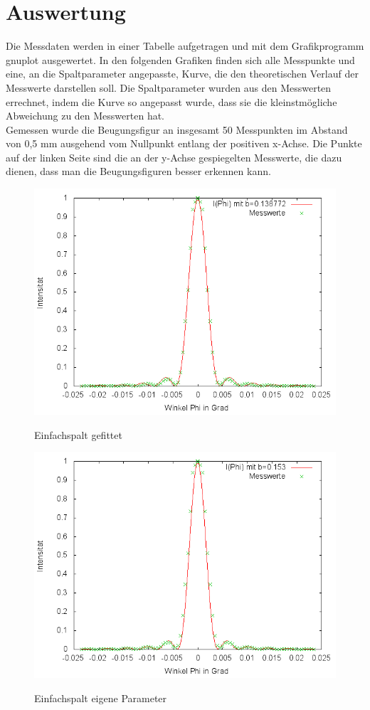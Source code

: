 \section{Auswertung}
Die Messdaten werden in einer Tabelle aufgetragen und mit dem Grafikprogramm gnuplot ausgewertet. In den folgenden Grafiken finden sich alle Messpunkte und eine, an die Spaltparameter angepasste, Kurve, die den theoretischen Verlauf der Messwerte darstellen soll. Die Spaltparameter wurden aus den Messwerten errechnet, indem die Kurve so angepasst wurde, dass sie die kleinstmögliche Abweichung zu den Messwerten hat.\\
Gemessen wurde die Beugungsfigur an insgesamt 50 Messpunkten im Abstand von 0,5 mm ausgehend vom Nullpunkt entlang der positiven x-Achse. Die Punkte auf der linken Seite sind die an der y-Achse gespiegelten Messwerte, die dazu dienen, dass man die Beugungsfiguren besser erkennen kann.

\begin{figure}[htbp]
\includegraphics[width=12cm]{pics/1.png}
\centering
\label{a1}
\caption{Einfachspalt gefittet}
\end{figure}

\begin{figure}[htbp]
\includegraphics[width=12cm]{pics/3.png}
\centering
\label{a2}
\caption{Einfachspalt eigene Parameter}
\end{figure}


